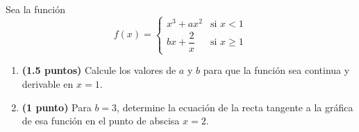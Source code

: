 
Sea la función
\[
f(x)=\begin{cases}
x^3+ax^2 & \text{si }x<1\\[4pt]
bx+\dfrac{2}{x} & \text{si }x\geq1
\end{cases}
\]
\begin{enumerate}[label=\alph*)]
\item \textbf{(1.5 puntos)} Calcule los valores de $a$ y $b$ para que la función sea continua y derivable en $x=1$.
\item \textbf{(1 punto)} Para $b=3$, determine la ecuación de la recta tangente a la gráfica de esa función en el punto de abscisa $x=2$.
\end{enumerate}
